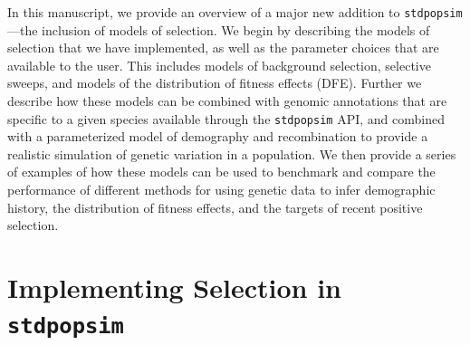 \documentclass[hidelinks]{article}
\newcommand{\stdpopsim}{\texttt{stdpopsim}\xspace}
\begin{document}
    In this manuscript, we provide an overview of a major new addition
    to \stdpopsim---the inclusion of models of selection.
    We begin by describing the models of selection that we have implemented,
    as well as the parameter choices that are available to the user.
    This includes models of background selection, selective sweeps, and
    models of the distribution of fitness effects (DFE).
    Further we describe how these models can be combined with genomic
    annotations that are specific to a given species available
    through the \stdpopsim API, and combined with a parameterized model of
    demography and recombination to provide a realistic simulation of
    genetic variation in a population.
    We then provide a series of examples of how these models can be used
    to benchmark and compare the performance of different methods for
    using genetic data to infer demographic history, the distribution of fitness effects,
    and the targets of recent positive selection. 

\section*{Implementing Selection in \stdpopsim}
    \label{selection}
\end{document}
